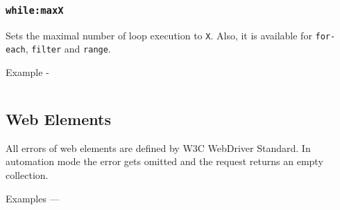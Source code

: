 \subsubsection{\texttt{while:maxX}}

Sets the maximal number of loop execution to \texttt{X}. Also, it is available for \texttt{for-each}, \texttt{filter} and \texttt{range}.

Example -
\inputminted[linenos]{icl}{../sources/maxlimitsheet.icL}

\subsection{Web Elements}

All errors of web elements are defined by W3C WebDriver Standard. In automation mode the error  gets omitted and the request returns an empty collection.

Examples —
\inputminted[linenos]{icl}{../sources/webelementsheet.icL}

